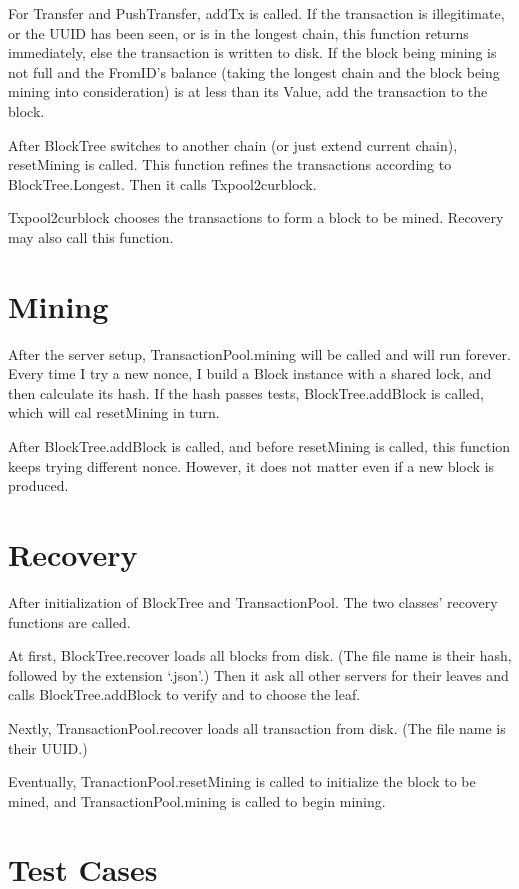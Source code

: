 \documentclass{article}
\begin{document}
For Transfer and PushTransfer, addTx is called.
If the transaction is illegitimate, or the UUID has been seen, or is in the longest chain, this function returns immediately, else the transaction is written to disk.
If the block being mining is not full and the FromID's balance (taking the longest chain and the block being mining into consideration) is at less than its Value, add the transaction to the block.

After BlockTree switches to another chain (or just extend current chain), resetMining is called.
This function refines the transactions according to BlockTree.Longest.
Then it calls Txpool2curblock.

Txpool2curblock chooses the transactions to form a block to be mined.
Recovery may also call this function.

\section{Mining}

After the server setup, TransactionPool.mining will be called and will run forever.
Every time I try a new nonce, I build a Block instance with a shared lock, and then calculate its hash.
If the hash passes tests, BlockTree.addBlock is called, which will cal resetMining in turn.

After BlockTree.addBlock is called, and before resetMining is called, this function keeps trying different nonce.
However, it does not matter even if a new block is produced.

\section{Recovery}

After initialization of BlockTree and TransactionPool.
The two classes' recovery functions are called.

At first, BlockTree.recover loads all blocks from disk. (The file name is their hash, followed by the extension `.json'.)
Then it ask all other servers for their leaves and calls BlockTree.addBlock to verify and to choose the leaf.

Nextly, TransactionPool.recover loads all transaction from disk. (The file name is their UUID.)

Eventually, TranactionPool.resetMining is called to initialize the block to be mined, and TransactionPool.mining is called to begin mining.

\section{Test Cases}
\end{document}
